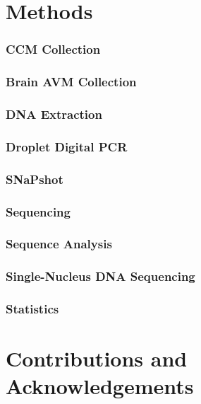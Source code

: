 \section{Methods}
\subsubsection{CCM Collection}
\subsubsection{Brain AVM Collection}
\subsubsection{DNA Extraction}
\subsubsection{Droplet Digital PCR}
\subsubsection{SNaPshot}
\subsubsection{Sequencing}
\subsubsection{Sequence Analysis}
\subsubsection{Single-Nucleus DNA Sequencing}
\subsubsection{Statistics}

\section{Contributions and Acknowledgements}